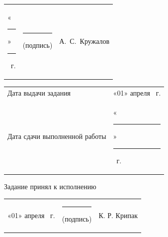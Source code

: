\documentclass[14pt, a4paper]{extarticle}
\begin{document}
{
\renewcommand{\arraystretch}{2}
\noindent
\begin{tabularx}{\textwidth}{@{} P{0.45\textwidth} P{0.3\textwidth} P{0.25\textwidth} @{}}

    «\rule{0.8cm}{0.4pt}» \quad \rule{2cm}{0.4pt} ~г. &
    \centering \rule{3.5cm}{0.4pt} \par \footnotesize (подпись) &
    \hfill А.~С.~Кружалов                                         \\
\end{tabularx}

\begin{tabularx}{\textwidth}{@{} P{0.45\textwidth} P{0.55\textwidth} @{}}
    Дата выдачи задания           &
    \hfill «01» \quad апреля ~г. \\

    Дата сдачи выполненной работы &
    \hfill «\rule{0.8cm}{0.4pt}» \quad \rule{2cm}{0.4pt} ~г. \\
\end{tabularx}
}

Задание принял к исполнению

{
\renewcommand{\arraystretch}{1.5}
\begin{tabularx}{\textwidth}{@{} P{0.45\textwidth} P{0.3\textwidth} P{0.25\textwidth} @{}}

    «01» \quad апреля ~г. &
    \centering \rule{3.5cm}{0.4pt} \par \footnotesize (подпись) &
    \hfill К. Р. Крипак                                           \\
\end{tabularx}
}
\end{document}
